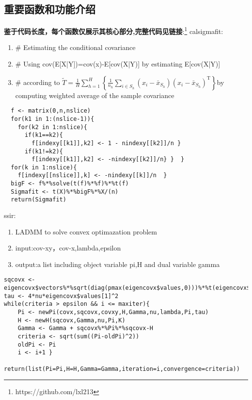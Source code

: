 \documentclass[lang=cn,11pt,a4paper]{elegantpaper}
\newcommand{\Blue}[1]{\textcolor[rgb]{0,0,0.803}{#1}}
\begin{document}
\subsection{重要函数和功能介绍}
\textbf{鉴于代码长度，每个函数仅展示其核心部分,完整代码见链接}:\footnote{https://github.com/lxl213} \newline
\Blue{\large  calsigmafit:} 
\begin{enumerate}
    \item # Estimating the conditional covariance
\item# Using cov(E[X|Y])=cov(x)-E[cov(X|Y)] by estimating E[cov(X|Y)]
\item# according to $\tilde{T}=\frac{1}{H} \sum_{h=1}^{H}\left\{\frac{1}{n_{h}} \sum_{i \in S_{h}}\left(x_{i}-\bar{x}_{S_{h}}\right)\left(x_{i}-\bar{x}_{S_{h}}\right)^{\mathrm{T}}\right\}$by computing weighted average of the sample covariance
\end{enumerate}
\begin{lstlisting}
  f <- matrix(0,n,nslice)
  for(k1 in 1:(nslice-1)){
    for(k2 in 1:nslice){
      if(k1==k2){
        f[indexy[[k1]],k2] <- 1 - nindexy[[k2]]/n }
      if(k1!=k2){
        f[indexy[[k1]],k2] <- -nindexy[[k2]]/n} }  }
  for(k in 1:nslice){
    f[indexy[[nslice]],k] <- -nindexy[[k]]/n  }
  bigF <- f%*%solve(t(f)%*%f)%*%t(f)
  Sigmafit <- t(X)%*%bigF%*%X/(n)
  return(Sigmafit)
\end{lstlisting}

\Blue{\large  ssir:} 
\begin{enumerate}
    \item LADMM to solve convex optimazation problem 
\item input:cov-xy，cov-x,lambda,epsilon
\item output:a list including object variable pi,H and dual variable gamma
\end{enumerate}

\begin{lstlisting}
sqcovx <- eigencovx$vectors%*%sqrt(diag(pmax(eigencovx$values,0)))%*%t(eigencovx$vectors)	
tau <- 4*nu*eigencovx$values[1]^2	
while(criteria > epsilon && i <= maxiter){
    Pi <- newPi(covx,sqcovx,covxy,H,Gamma,nu,lambda,Pi,tau)
    H <- newH(sqcovx,Gamma,nu,Pi,K)
    Gamma <- Gamma + sqcovx%*%Pi%*%sqcovx-H	
    criteria <- sqrt(sum((Pi-oldPi)^2)) 
    oldPi <- Pi
    i <- i+1 }
    return(list(Pi=Pi,H=H,Gamma=Gamma,iteration=i,convergence=criteria))
\end{lstlisting}
\end{document}
